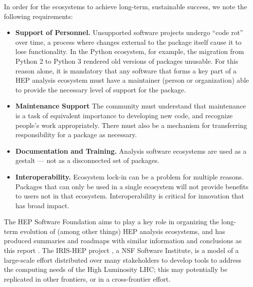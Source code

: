 In order for the ecosystems to achieve long-term, sustainable success, we note the following requirements:
\begin{itemize}
    \item \textbf{Support of Personnel.} Unsupported software projects undergo ``code rot'' over time, a process where changes external to the package itself cause it to lose functionality. In the Python ecosystem, for example, the migration from Python 2 to Python 3 rendered old versions of packages unusable. For this reason alone, it is mandatory that any software that forms a key part of a HEP analysis ecosystem must have a maintainer (person or organization) able to provide the necessary level of support for the package. 
    \item \textbf{Maintenance Support} The community must understand that maintenance is a task of equivalent importance to developing new code, and recognize people's work appropriately. There must also be a mechanism for transferring responsibility for a package as necessary.   
    \item \textbf{Documentation and Training.} Analysis software ecosystems are used as a gestalt --- not as a disconnected set of packages. 
    \item \textbf{Interoperability.} Ecosystem lock-in can be a problem for multiple reasons. Packages that can only be used in a single ecosystem will not provide benefits to users not in that ecosystem. Interoperability is critical for innovation that has broad impact.
\end{itemize}

The HEP Software Foundation aims to play a key role in organizing the long-term evolution of (among other things) HEP analysis ecosystems, and has produced summaries and roadmaps with similar information and conclusions as this report \cite{HSF,Pivarski:2022ycs}. The IRIS-HEP project \cite{IRISHEPWEB}, a NSF Software Institute, is a model of a large-scale effort distributed over many stakeholders to develop tools to address the computing needs of the High Luminosity LHC; this may potentially be replicated in other frontiers, or in a cross-frontier effort.


